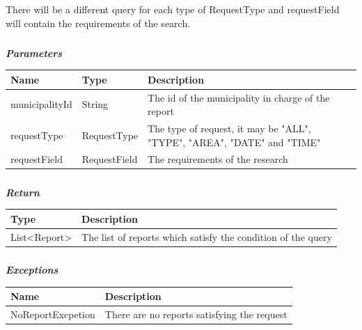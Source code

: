 							There will be a different query for each type of RequestType and requestField will contain the requirements of the search.
							\subparagraph{}
							\textit{\textbf{Parameters}}
							\vspace{-2mm}
								\begin{table}[!h]
									\begin{tabular}{L{0.2\textwidth}L{0.2\textwidth}L{0.4\textwidth}}
										\toprule
										\textbf{Name} & \textbf{Type} & \textbf{Description} \\
										\midrule
								  		municipalityId & String & The id of the municipality in charge of the report \\
								  		requestType & RequestType & The type of request, it may be "ALL", "TYPE", "AREA", "DATE" and "TIME" \\
								  		requestField & RequestField & The requirements of the research \\
								 		\bottomrule
									\end{tabular}
								\end{table}
							\vspace{-6mm}
							\subparagraph{}
								\textit{\textbf{Return}}
								\vspace{-2mm}
									\begin{table}[!h]
									\begin{tabular}{L{0.25\textwidth}L{0.5\textwidth}}
										\toprule
										\textbf{Type} & \textbf{Description} \\
										\midrule
								  		List<Report> & The list of reports which satisfy the condition of the query \\
								 		\bottomrule
									\end{tabular}
								\end{table}
							\vspace{-6mm}
							\subparagraph{}
								\textit{\textbf{Exceptions}}
								\vspace{-2mm}
									\begin{table}[!h]
									\begin{tabular}{ll}
										\toprule
										\textbf{Name} & \textbf{Description} \\
										\midrule
								  		NoReportExcpetion & There are no reports satisfying the request \\ 
								 		\bottomrule
									\end{tabular}
								\end{table}

